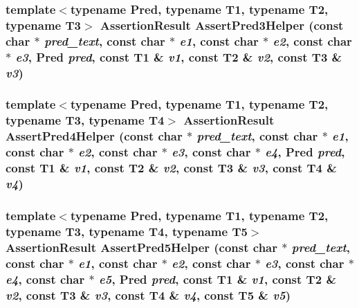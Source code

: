 \subsubsection{\setlength{\rightskip}{0pt plus 5cm}template$<$typename Pred, typename T1, typename T2, typename T3$>$ AssertionResult AssertPred3Helper (const char $\ast$ {\em pred\_\-text}, const char $\ast$ {\em e1}, const char $\ast$ {\em e2}, const char $\ast$ {\em e3}, Pred {\em pred}, const T1 \& {\em v1}, const T2 \& {\em v2}, const T3 \& {\em v3})\hspace{0.3cm}{\tt  [inline]}}\label{gtest__pred__impl_8h_c7ee5e2ca4f22d94e70b62deee763c84}


\subsubsection{\setlength{\rightskip}{0pt plus 5cm}template$<$typename Pred, typename T1, typename T2, typename T3, typename T4$>$ AssertionResult AssertPred4Helper (const char $\ast$ {\em pred\_\-text}, const char $\ast$ {\em e1}, const char $\ast$ {\em e2}, const char $\ast$ {\em e3}, const char $\ast$ {\em e4}, Pred {\em pred}, const T1 \& {\em v1}, const T2 \& {\em v2}, const T3 \& {\em v3}, const T4 \& {\em v4})\hspace{0.3cm}{\tt  [inline]}}\label{gtest__pred__impl_8h_13d4772c4febac7e79847158d3c0c301}


\subsubsection{\setlength{\rightskip}{0pt plus 5cm}template$<$typename Pred, typename T1, typename T2, typename T3, typename T4, typename T5$>$ AssertionResult AssertPred5Helper (const char $\ast$ {\em pred\_\-text}, const char $\ast$ {\em e1}, const char $\ast$ {\em e2}, const char $\ast$ {\em e3}, const char $\ast$ {\em e4}, const char $\ast$ {\em e5}, Pred {\em pred}, const T1 \& {\em v1}, const T2 \& {\em v2}, const T3 \& {\em v3}, const T4 \& {\em v4}, const T5 \& {\em v5})\hspace{0.3cm}{\tt  [inline]}}\label{gtest__pred__impl_8h_654b27ad7a124310670cbc3fe40e721b}



